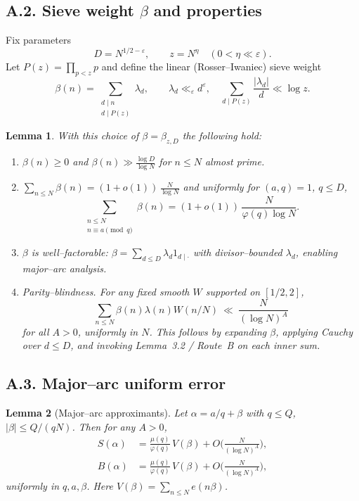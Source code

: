 \documentclass[11pt]{article}
\newtheorem{lemma}{Lemma}[section]
\theoremstyle{definition}
\theoremstyle{remark}
\begin{document}
\subsection*{A.2. Sieve weight $\beta$ and properties}

Fix parameters
\[
D=N^{1/2-\varepsilon},\qquad z=N^{\eta}\quad(0<\eta\ll \varepsilon).
\]
Let $P(z)=\prod_{p<z}p$ and define the linear (Rosser--Iwaniec) sieve weight
\[
\beta(n)=\sum_{\substack{d\mid n\\ d\mid P(z)}} \lambda_d,\qquad 
\lambda_d\ll_\varepsilon d^{\varepsilon},\quad
\sum_{d\mid P(z)}\frac{|\lambda_d|}{d}\ll \log z.
\]

\begin{lemma}\label{lem:beta-properties}
With this choice of $\beta=\beta_{z,D}$ the following hold:
\begin{enumerate}[label=(B\arabic*)]
\item $\beta(n)\ge 0$ and $\beta(n)\gg \frac{\log D}{\log N}$ for $n\le N$ almost prime.
\item $\sum_{n\le N}\beta(n)=(1+o(1))\,\tfrac{N}{\log N}$ and uniformly for $(a,q)=1$, $q\le D$,
\[
\sum_{\substack{n\le N\\ n\equiv a\pmod q}}\beta(n)
=(1+o(1))\,\frac{N}{\varphi(q)\log N}.
\]
\item $\beta$ is well--factorable: $\beta=\sum_{d\le D}\lambda_d 1_{d\mid\cdot}$ with divisor--bounded $\lambda_d$, enabling major--arc analysis.
\item \emph{Parity--blindness.} For any fixed smooth $W$ supported on $[1/2,2]$,
\[
\sum_{n\le N}\beta(n)\lambda(n)W(n/N)
\ \ll\ \frac{N}{(\log N)^A}
\]
for all $A>0$, uniformly in $N$. This follows by expanding $\beta$, applying Cauchy over $d\le D$, and invoking Lemma~3.2 / Route~B on each inner sum.
\end{enumerate}
\end{lemma}

\subsection*{A.3. Major--arc uniform error}

\begin{lemma}[Major--arc approximants]\label{lem:major-errors}
Let $\alpha=a/q+\beta$ with $q\le Q$, $|\beta|\le Q/(qN)$. Then for any $A>0$,
\begin{align*}
S(\alpha)&=\frac{\mu(q)}{\varphi(q)}\,V(\beta)+O\!\Big(\frac{N}{(\log N)^A}\Big),\\
B(\alpha)&=\frac{\mu(q)}{\varphi(q)}\,V(\beta)+O\!\Big(\frac{N}{(\log N)^A}\Big),
\end{align*}
uniformly in $q,a,\beta$. Here $V(\beta)=\sum_{n\le N}e(n\beta)$. 
\end{lemma}
\end{document}
